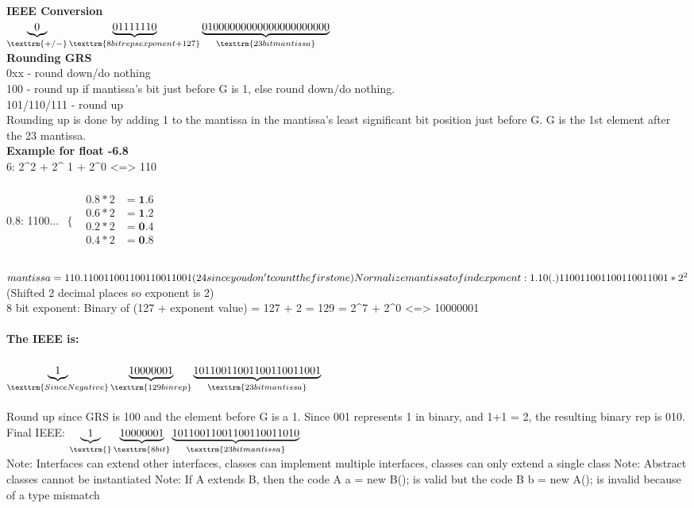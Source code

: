 \documentclass{article}
\begin{document}
\textbf{IEEE Conversion}\\
   $ \underbrace{0}_\texttrm{+/-}  \underbrace{01111110}_\texttrm{8 bit reps exponent + 127}  \underbrace{01000000000000000000000}_\texttrm{23 bit mantissa}$\\

   
\textbf{Rounding GRS}\\ 
0xx - round down/do nothing\\
100 - round up if mantissa's bit just before G is 1, else round down/do nothing.\\
101/110/111 - round up\\
Rounding up is done by adding 1 to the mantissa in the mantissa's least significant bit position just before G. G is the 1st element after the 23 mantissa.\\
\textbf{Example for float -6.8}\\
6: 2^2 + 2^ 1 + 2^0 <=> 110\\\\
0.8: 1100...
$
\begin{array}{cc}
  \{ & 
    \begin{array}{cc}
      0.8*2 & =\textbf{1}.6 \\
      0.6*2 & =\textbf{1}.2 \\
      0.2*2 & =\textbf{0}.4 \\
      0.4*2 & =\textbf{0}.8 \\
    \end{array}
\end{array}
$\\\\
$
mantissa = 110.1100 1100 1100 1100 1100 1 (24 since you don't count the first one)\\
Normalize mantissa to find exponent: 1.10(.)110011001100110011001 * 2^2$ (Shifted 2 decimal places so exponent is 2)\\

8 bit exponent: Binary of (127 + exponent value) = 127 + 2 = 129 = 2^7 + 2^0 <=> 10000001\\\\
\textbf{The IEEE is: }\\\\
$ \underbrace{1}_\texttrm{Since Negative}  \underbrace{10000001}_\texttrm{129 bin rep}  \underbrace{10110011001100110011001}_\texttrm{23 bit mantissa}$\\\\
Round up since GRS is 100 and the element before G is a 1. Since 001 represents 1 in binary, and 1+1 = 2, the resulting binary rep is 010.\\
Final IEEE:  {$ \underbrace{1}_\texttrm{ }  \underbrace{10000001}_\texttrm{8 bit}  \underbrace{10110011001100110011010}_\texttrm{23 bit mantissa}$}\\
Note: Interfaces can extend other interfaces, classes can implement multiple interfaces, classes can only extend a single class
Note: Abstract classes cannot be instantiated
Note: If A extends B, then the code {A a = new B();} is valid but the code {B b = new A();} is invalid because of a type mismatch
\end{document}
